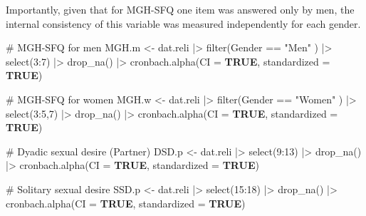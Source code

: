 \documentclass[
  bookmarksnumbered]{article}
\newenvironment{Shaded}{\begin{snugshade}}{\end{snugshade}}
\newcommand{\AttributeTok}[1]{\textcolor[rgb]{0.80,0.80,0.80}{#1}}
\newcommand{\CommentTok}[1]{\textcolor[rgb]{0.50,0.62,0.50}{#1}}
\newcommand{\ConstantTok}[1]{\textcolor[rgb]{0.86,0.64,0.64}{\textbf{#1}}}
\newcommand{\DecValTok}[1]{\textcolor[rgb]{0.86,0.86,0.80}{#1}}
\newcommand{\FunctionTok}[1]{\textcolor[rgb]{0.94,0.94,0.56}{#1}}
\newcommand{\NormalTok}[1]{\textcolor[rgb]{0.80,0.80,0.80}{#1}}
\newcommand{\OtherTok}[1]{\textcolor[rgb]{0.94,0.94,0.56}{#1}}
\newcommand{\SpecialCharTok}[1]{\textcolor[rgb]{0.86,0.64,0.64}{#1}}
\newcommand{\StringTok}[1]{\textcolor[rgb]{0.80,0.58,0.58}{#1}}
\begin{document}
Importantly, given that for MGH-SFQ one item was answered only by men, the internal consistency of this variable was measured independently for each gender.

\begin{Shaded}
\begin{Highlighting}[]
\CommentTok{\# MGH{-}SFQ for men}
\NormalTok{MGH.m }\OtherTok{\textless{}{-}}\NormalTok{ dat.reli }\SpecialCharTok{|\textgreater{}}
  \FunctionTok{filter}\NormalTok{(Gender }\SpecialCharTok{==} \StringTok{"Men"}\NormalTok{ ) }\SpecialCharTok{|\textgreater{}} 
  \FunctionTok{select}\NormalTok{(}\DecValTok{3}\SpecialCharTok{:}\DecValTok{7}\NormalTok{) }\SpecialCharTok{|\textgreater{}} 
  \FunctionTok{drop\_na}\NormalTok{() }\SpecialCharTok{|\textgreater{}}  
  \FunctionTok{cronbach.alpha}\NormalTok{(}\AttributeTok{CI =} \ConstantTok{TRUE}\NormalTok{, }\AttributeTok{standardized =} \ConstantTok{TRUE}\NormalTok{)}

\CommentTok{\# MGH{-}SFQ for women}
\NormalTok{MGH.w }\OtherTok{\textless{}{-}}\NormalTok{ dat.reli }\SpecialCharTok{|\textgreater{}}
  \FunctionTok{filter}\NormalTok{(Gender }\SpecialCharTok{==} \StringTok{"Women"}\NormalTok{ ) }\SpecialCharTok{|\textgreater{}} 
  \FunctionTok{select}\NormalTok{(}\DecValTok{3}\SpecialCharTok{:}\DecValTok{5}\NormalTok{,}\DecValTok{7}\NormalTok{) }\SpecialCharTok{|\textgreater{}} 
  \FunctionTok{drop\_na}\NormalTok{() }\SpecialCharTok{|\textgreater{}} 
  \FunctionTok{cronbach.alpha}\NormalTok{(}\AttributeTok{CI =} \ConstantTok{TRUE}\NormalTok{, }\AttributeTok{standardized =} \ConstantTok{TRUE}\NormalTok{)}

\CommentTok{\# Dyadic sexual desire (Partner)}
\NormalTok{DSD.p }\OtherTok{\textless{}{-}}\NormalTok{ dat.reli }\SpecialCharTok{|\textgreater{}}
  \FunctionTok{select}\NormalTok{(}\DecValTok{9}\SpecialCharTok{:}\DecValTok{13}\NormalTok{) }\SpecialCharTok{|\textgreater{}} 
  \FunctionTok{drop\_na}\NormalTok{() }\SpecialCharTok{|\textgreater{}} 
  \FunctionTok{cronbach.alpha}\NormalTok{(}\AttributeTok{CI =} \ConstantTok{TRUE}\NormalTok{, }\AttributeTok{standardized =} \ConstantTok{TRUE}\NormalTok{)}

\CommentTok{\# Solitary sexual desire}
\NormalTok{SSD.p }\OtherTok{\textless{}{-}}\NormalTok{ dat.reli }\SpecialCharTok{|\textgreater{}}
  \FunctionTok{select}\NormalTok{(}\DecValTok{15}\SpecialCharTok{:}\DecValTok{18}\NormalTok{) }\SpecialCharTok{|\textgreater{}} 
  \FunctionTok{drop\_na}\NormalTok{() }\SpecialCharTok{|\textgreater{}} 
  \FunctionTok{cronbach.alpha}\NormalTok{(}\AttributeTok{CI =} \ConstantTok{TRUE}\NormalTok{, }\AttributeTok{standardized =} \ConstantTok{TRUE}\NormalTok{)}


\end{Highlighting}
\end{Shaded}
\end{document}
